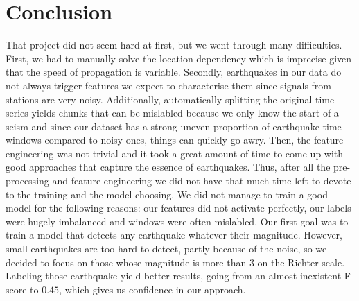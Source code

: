 \documentclass[10pt,conference,compsocconf]{IEEEtran}
\begin{document}
\section{Conclusion}
That project did not seem hard at first, but we went through many difficulties. First, we had to manually solve the location dependency which is imprecise given that the speed of propagation is variable. Secondly, earthquakes in our data do not always trigger features we expect to characterise them since signals from stations are very noisy. Additionally, automatically splitting the original time series yields chunks that can be mislabled because we only know the start of a seism and since our dataset has a strong uneven proportion of earthquake time windows compared to noisy ones, things can quickly go awry. Then, the feature engineering was not trivial and it took a great amount of time to come up with good approaches that capture the essence of earthquakes.\newline
Thus, after all the pre-processing and feature engineering we did not have that much time left to devote to the training and the model choosing. We did not manage to train a good model for the following reasons: our features did not activate perfectly, our labels were hugely imbalanced and windows were often mislabled. Our first goal was to train a model that detects any earthquake whatever their magnitude. However, small earthquakes are too hard to detect, partly because of the noise, so we decided to focus on those whose magnitude is more than $3$ on the Richter scale. Labeling those earthquake yield better results, going from an almost inexistent F-score to $0.45$, which gives us confidence in our approach.\newline
\end{document}
